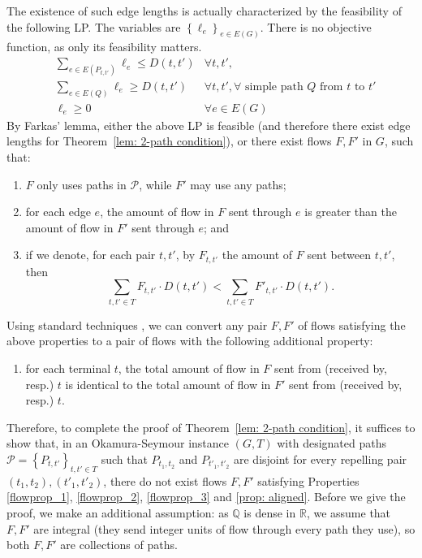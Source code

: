 \documentclass[11pt]{article}
\newcommand{\pset}{{\mathcal{P}}}
\newcommand{\set}[1]{\left\{ #1 \right\}}
\begin{document}
The existence of such edge lengths is actually characterized by the feasibility of the following LP. The variables are $\set{\ell_e}_{e\in E(G)}$. There is no objective function, as only its feasibility matters.
%
\begin{eqnarray*}
&\sum_{e\in E(P_{t,t'})}\ell_e\leq D(t,t') &\forall t,t', \\
&\sum_{e\in E(Q)}\ell_e\geq D(t,t') &\forall t,t', \forall \text{ simple path }Q\text{  from }t \text{ to  }t'\\
	&\ell_e\geq 0&\forall e\in E(G)
\end{eqnarray*}
%
By Farkas' lemma, either the above LP is feasible (and therefore there exist edge lengths for Theorem~\ref{lem: 2-path condition}), or
there exist flows $F,F'$ in $G$, such that:
    \begin{enumerate}
        \item $F$ only uses paths in $\pset$, while $F'$ may use any paths; 
        \label{flowprop_1}
        \item for each edge $e$, the amount of flow in $F$ sent through $e$ is greater than the amount of flow in $F'$ sent through $e$; and \label{flowprop_2}
        \item if we denote, for each pair $t,t'$, by $F_{t,t'}$ the amount of $F$ sent between $t,t'$, then
        \[\sum_{t,t'\in T}F_{t,t'}\cdot D(t,t')<\sum_{t,t'\in T}F'_{t,t'}\cdot D(t,t').\] \label{flowprop_3}
    \end{enumerate}

Using standard techniques \cite{chen2025path}, we can convert any pair $F,F'$ of flows satisfying the above properties to a pair of flows with the following additional property:
    \begin{enumerate}[resume]
    \item for each terminal $t$, the total amount of flow in $F$ sent from (received by, resp.) $t$ is identical to the total amount of flow in $F'$ sent from (received by, resp.) $t$. \label{prop: aligned}
    \end{enumerate}

Therefore, to complete the proof of Theorem~\ref{lem: 2-path condition}, it suffices to show that, in an Okamura-Seymour instance $(G,T)$ with designated paths $\pset=\set{P_{t,t'}}_{t,t'\in T}$ such that $P_{t_1,t_2}$ and $P_{t'_1,t'_2}$ are disjoint for every repelling pair $(t_1,t_2),(t'_1,t'_2)$, there do not exist flows $F,F'$ satisfying Properties \ref{flowprop_1}, \ref{flowprop_2}, \ref{flowprop_3} and \ref{prop: aligned}.
Before we give the proof, we make an additional assumption: as $\mathbb{Q}$ is dense in $\mathbb{R}$, we assume that $F,F'$ are integral (they send integer units of flow through every path they use), so both $F,F'$ are  collections of paths.
\end{document}

